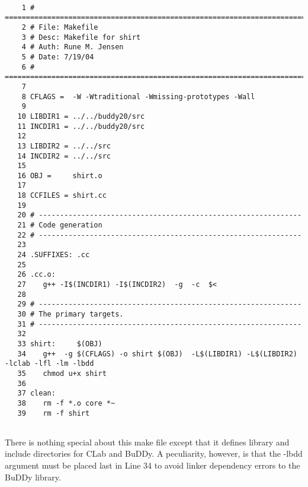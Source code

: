 \documentclass{article}
\begin{document}
\begin{verbatim}
   
    1 # ==========================================================================
    2 # File: Makefile
    3 # Desc: Makefile for shirt
    4 # Auth: Rune M. Jensen
    5 # Date: 7/19/04
    6 # ==========================================================================
    7   
    8 CFLAGS =  -W -Wtraditional -Wmissing-prototypes -Wall 
    9   
   10 LIBDIR1 = ../../buddy20/src
   11 INCDIR1 = ../../buddy20/src
   12 
   13 LIBDIR2 = ../../src
   14 INCDIR2 = ../../src
   15
   16 OBJ =     shirt.o 
   17
   18 CCFILES = shirt.cc
   19 
   20 # --------------------------------------------------------------
   21 # Code generation
   22 # --------------------------------------------------------------
   23
   24 .SUFFIXES: .cc 
   25
   26 .cc.o:
   27 	 g++ -I$(INCDIR1) -I$(INCDIR2)  -g  -c  $<
   28
   29 # --------------------------------------------------------------
   30 # The primary targets.
   31 # -------------------------------------------------------------- 
   32
   33 shirt:	 $(OBJ)
   34	 g++  -g $(CFLAGS) -o shirt $(OBJ)  -L$(LIBDIR1) -L$(LIBDIR2) -lclab -lfl -lm -lbdd
   35	 chmod u+x shirt
   36  
   37 clean:
   38	 rm -f *.o core *~
   39 	 rm -f shirt
   
\end{verbatim} 
\normalsize
There is nothing special about this make file except that it defines
library and include directories for CLab and BuDDy. A peculiarity,
however, is that the -lbdd argument must be placed last in Line 34 to
avoid linker dependency errors to the BuDDy library.
\end{document}
